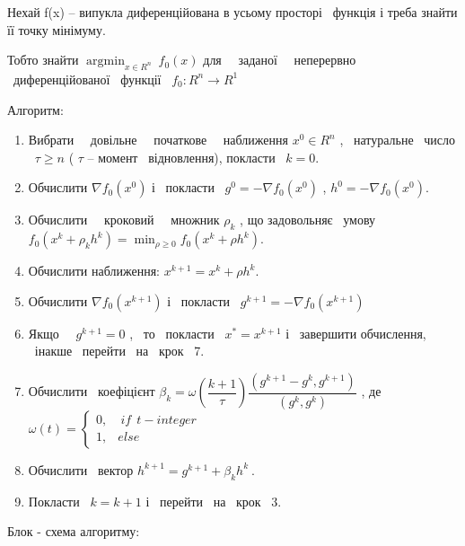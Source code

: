 \documentclass[12pt, letterpaper, twoside]{article}
\DeclareMathOperator*{\argmin}{argmin}
\begin{document}
Нехай f(x) – випукла диференційована в усьому просторі \ функція і треба знайти її точку мінімуму.

Тобто знайти  $\displaystyle \argmin_{x\in R^{n}} \ f_{0}( x)$ для \ \ заданої \ \ неперервно \ диференційованої \ функції \ $\displaystyle f_{0} :R^{n}\rightarrow R^{1}$
\vspace{0.9cm}



Алгоритм:
\begin{enumerate}
	\item Вибрати \ \ довільне \ \ початкове \ \ наближення $\displaystyle x^{0} \in R^{n}$ , \ натуральне \ число \ $\displaystyle \tau \geqslant n$ ( $\displaystyle \tau $ – момент \ відновлення), покласти \ $\displaystyle k=0$.
	\item Обчислити $\displaystyle \nabla f_{0}\left( x^{0}\right)$ і \ покласти \ $\displaystyle g^{0} =-\nabla f_{0}\left( x^{0}\right)$ , $\displaystyle h^{0} =-\nabla f_{0}\left( x^{0}\right)$.
	\item Обчислити \ \ кроковий \ \ множник $\displaystyle \rho _{k}$ , що задовольняє \ умову $\displaystyle f_{0}\left( x^{k} +\rho _{k} h^{k}\right) =\min_{\rho \geqslant 0} f_{0}\left( x^{k} +\rho h^{k}\right)$.
	\item Обчислити наближення: $\displaystyle x^{k+1} =x^{k} +\rho h^{k}$.
	\item Обчислити $\displaystyle \nabla f_{0}\left( x^{k+1}\right)$ і \ покласти \ $\displaystyle g^{k+1} =-\nabla f_{0}\left( x^{k+1}\right)$
	\item Якщо \ \ $\displaystyle g^{k+1} =0$ , \ то \ покласти \ $\displaystyle x^{*} =x^{k+1}$ і \ завершити обчислення, \ інакше \ перейти \ на \ крок \ 7.
	\item Обчислити \ коефіцієнт $\displaystyle \beta _{k} =\omega \left(\dfrac{k+1}{\tau }\right)\dfrac{\left( g^{k+1} -g^{k} ,g^{k+1}\right)}{\left( g^{k} ,g^{k}\right)}$ , де \\ $\displaystyle \omega ( t) =\begin{cases}
	0, & \ if\ \ t-integer\ \\
	1, & else
	\end{cases}$
	\item Обчислити \ вектор $\displaystyle h^{k+1} =g^{k+1} +\beta _{k} h^{k} \ .$
	\item  Покласти \ $\displaystyle k=k+1$ і \ перейти \ на \ крок \ 3.
\end{enumerate}
\clearpage
Блок - схема алгоритму:\\
\end{document}
